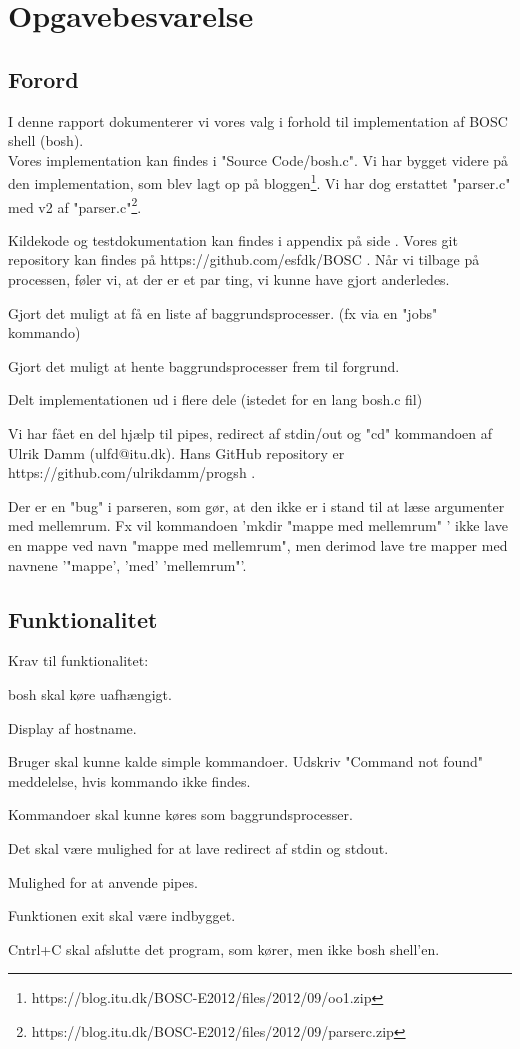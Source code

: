 \chapter{Opgavebesvarelse}
\section{Forord}
I denne rapport dokumenterer vi vores valg i forhold til implementation af BOSC shell (bosh). 
\\Vores implementation kan findes i "Source Code/bosh.c". Vi har bygget videre på den implementation, som blev lagt op på bloggen\footnote{https://blog.itu.dk/BOSC-E2012/files/2012/09/oo1.zip}. Vi har dog erstattet "parser.c" med v2 af  "parser.c"\footnote{ https://blog.itu.dk/BOSC-E2012/files/2012/09/parserc.zip}.

Kildekode og testdokumentation kan findes i appendix på side \pageref{Appendix}. Vores git repository kan findes på https://github.com/esfdk/BOSC .
Når vi tilbage på processen, føler vi, at der er et par ting, vi kunne have gjort anderledes.
\begin{my_itemize}
\item Gjort det muligt at få en liste af baggrundsprocesser. (fx via en "jobs" kommando)
\item Gjort det muligt at hente baggrundsprocesser frem til forgrund.
\item Delt implementationen ud i flere dele (istedet for en lang bosh.c fil)
\end{my_itemize}

Vi har fået en del hjælp til pipes, redirect af stdin/out og "cd" kommandoen af Ulrik Damm (ulfd@itu.dk). Hans GitHub repository er https://github.com/ulrikdamm/progsh .

Der er en "bug" i parseren, som gør, at den ikke er i stand til at læse argumenter med mellemrum. Fx vil kommandoen 'mkdir "mappe med mellemrum" ' ikke lave en mappe ved navn "mappe med mellemrum", men derimod lave tre mapper med navnene '"mappe', 'med' 'mellemrum"'.

\section{Funktionalitet}
Krav til funktionalitet:
\begin{my_enumerate}
\item bosh skal køre uafhængigt.
\item Display af hostname.
\item Bruger skal kunne kalde simple kommandoer. Udskriv "Command not found" meddelelse, hvis kommando ikke findes.
\item Kommandoer skal kunne køres som baggrundsprocesser.
\item Det skal være mulighed for at lave redirect af stdin og stdout.
\item Mulighed for at anvende pipes.
\item Funktionen exit skal være indbygget.
\item Cntrl+C skal afslutte det program, som kører, men ikke bosh shell'en.
\end{my_enumerate}

